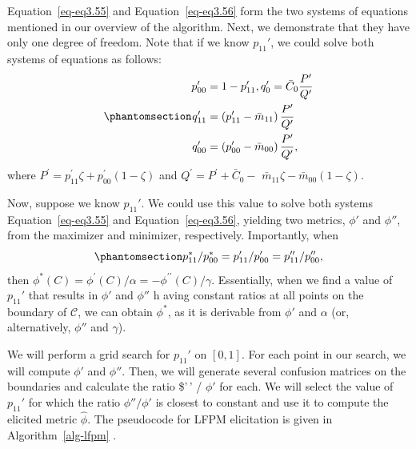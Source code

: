 \documentclass[
  letterpaper,
  numbers=noenddot,
  DIV=11]{scrreprt}
\theoremstyle{plain}
\theoremstyle{definition}
\theoremstyle{plain}
\theoremstyle{remark}
\begin{document}
Equation~\ref{eq-eq3.55} and Equation~\ref{eq-eq3.56} form the two
systems of equations mentioned in our overview of the algorithm. Next,
we demonstrate that they have only one degree of freedom. Note that if
we know \(p_{11}'\), we could solve both systems of equations as
follows:
\begin{equation}\phantomsection\label{eq-eq3.57}{\begin{aligned}
    p_{00}^{\prime}  &=1-p_{11}^{\prime}, q_{0}^{\prime}=\bar{C}_{0} \frac{P^{\prime}}{Q^{\prime}}\\
    q_{11}^{\prime}  &=\left(p_{11}^{\prime}-\bar{m}_{11}\right) \frac{P^{\prime}}{Q^{\prime}} \\
    q_{00}^{\prime}&=\left(p_{00}^{\prime}-\bar{m}_{00}\right) \frac{P^{\prime}}{Q^{\prime}},
\end{aligned}}\end{equation} where
\(P^{\prime}=p_{11}^{\prime} \zeta+p_{00}^{\prime}(1-\zeta)\) and
\(Q^{\prime}=P^{\prime}+\bar{C}_{0}-\)
\(\bar{m}_{11} \zeta-\bar{m}_{00}(1-\zeta).\)

Now, suppose we know \(p_{11}'\). We could use this value to solve both
systems Equation~\ref{eq-eq3.55} and Equation~\ref{eq-eq3.56}, yielding
two metrics, \(\phi'\) and \(\phi''\), from the maximizer and minimizer,
respectively. Importantly, when
\begin{equation}\phantomsection\label{eq-eq3.58}{p_{11}^{*} / p_{00}^{*}=p_{11}^{\prime} / p_{00}^{\prime}=p_{11}^{\prime \prime} / p_{00}^{\prime \prime},}\end{equation}
then
\(\phi^{*}(C)=\phi^{\prime}(C) / \alpha=-\phi^{\prime \prime}(C) / \gamma\).
Essentially, when we find a value of \(p_{11}'\) that results in
\(\phi'\) and \(\phi''\) h aving constant ratios at all points on the
boundary of \(\mathcal{C}\), we can obtain \(\phi^*\), as it is
derivable from \(\phi'\) and \(\alpha\) (or, alternatively, \(\phi''\)
and \(\gamma\)).

We will perform a grid search for \(p_{11}'\) on \([0,1]\). For each
point in our search, we will compute \(\phi'\) and \(\phi''\). Then, we
will generate several confusion matrices on the boundaries and calculate
the ratio \$\phi'\,' / \(\phi'\) for each. We will select the value of
\(p_{11}'\) for which the ratio \(\phi'' / \phi'\) is closest to
constant and use it to compute the elicited metric \(\hat{\phi}\). The
pseudocode for LFPM elicitation is given in  Algorithm~\ref{alg-lfpm} .
\end{document}
